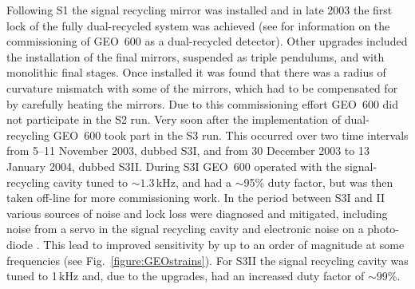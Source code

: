 \documentclass{article}
\begin{document}

Following S1 the signal recycling mirror was installed and in late 2003 the
first lock of the fully dual-recycled system was achieved (see
\cite{Smith:2004, Willke:2004, Grote:2005} for information on the commissioning
of GEO~600 as a dual-recycled detector). Other upgrades included the
installation of the final mirrors, suspended as triple pendulums, and with
monolithic final stages. Once installed it was found that there was a radius of
curvature mismatch with some of the mirrors, which had to be compensated for by
carefully heating the mirrors. Due to this commissioning effort GEO~600 did not
participate in the S2 run. Very soon after the implementation of dual-recycling
GEO~600 took part in the S3 run. This occurred over two time intervals
from 5--11 November 2003, dubbed S3I, and from 30 December 2003 to 13 January
2004, dubbed S3II. During S3I GEO~600 operated with the signal-recycling
cavity tuned to $\sim 1.3$\,kHz, and had a $\sim$95\% duty factor, but was then
taken off-line for more commissioning work. In the period between S3I and II
various sources of noise and lock loss were diagnosed and mitigated, including
noise from a servo in the signal recycling cavity and electronic noise on a
photo-diode \cite{Smith:2004}. This lead to improved sensitivity by up to an
order of magnitude at some frequencies (see Fig.~\ref{figure:GEOstrains}). For
S3II the signal recycling cavity was tuned to 1\,kHz and, due to the upgrades,
had an increased duty factor of $\sim$99\%.
\end{document}
